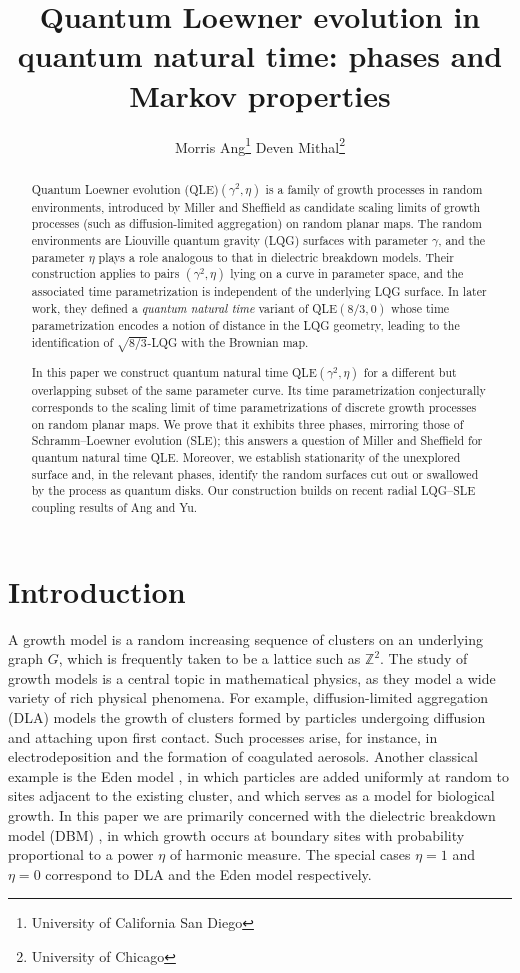 \documentclass[a4paper]{article}
\title{Quantum Loewner evolution in quantum natural time: phases and Markov properties}
\author{Morris Ang\thanks{University of California San Diego} \qquad Deven Mithal\thanks{University of Chicago}}
\date{}
\numberwithin{equation}{section}
\newcommand{\Z}{\mathbb{Z}}
\theoremstyle{remark}
\numberwithin{equation}{section}
\begin{document}
\maketitle

\begin{abstract}
Quantum Loewner evolution (QLE)$(\gamma^2, \eta)$ is a family of growth processes in random environments, introduced by Miller and Sheffield as candidate scaling limits of growth processes (such as diffusion-limited aggregation) on random planar maps. The random environments are Liouville quantum gravity (LQG) surfaces with parameter $\gamma$, and the parameter $\eta$ plays a role analogous to that in dielectric breakdown models. Their construction applies to pairs $(\gamma^2, \eta)$ lying on a curve in parameter space, and the associated time parametrization is independent of the underlying LQG surface. In later work, they defined a \emph{quantum natural time} variant of QLE$(8/3, 0)$ whose time parametrization encodes a notion of distance in the LQG geometry, leading to the identification of $\sqrt{8/3}$-LQG with the Brownian map.

In this paper we construct quantum natural time QLE$(\gamma^2, \eta)$ for a different but overlapping subset of the same parameter curve. Its time parametrization conjecturally corresponds to the scaling limit of time parametrizations of discrete growth processes on random planar maps. We prove that it exhibits three phases, mirroring those of Schramm--Loewner evolution (SLE); this answers a question of Miller and Sheffield for quantum natural time QLE. Moreover, we establish stationarity of the unexplored surface and, in the relevant phases, identify the random surfaces cut out or swallowed by the process as quantum disks. Our construction builds on recent radial LQG--SLE coupling results of Ang and Yu.
\end{abstract}


\tableofcontents

\section{Introduction}\label{sec-intro}
A growth model is a random increasing sequence of clusters on an underlying graph $G$, which is frequently taken to be a lattice such as $\Z^2$. The study of growth models is a central topic in mathematical physics, as they model a wide variety of rich physical phenomena. For example, diffusion-limited aggregation (DLA) \cite{dla-1, dla-2} models the growth of clusters formed by particles undergoing diffusion and attaching upon first contact. Such processes arise, for instance, in electrodeposition and the formation of coagulated aerosols. Another classical example is the Eden model \cite{eden}, in which particles are added uniformly at random to sites adjacent to the existing cluster, and which serves as a model for biological growth. 
In this paper we are primarily concerned with the dielectric breakdown model (DBM) \cite{dbm}, in which growth occurs at boundary sites with probability proportional to a power $\eta$ of harmonic measure. The special cases $\eta = 1$ and $\eta = 0$ correspond to DLA and the Eden model respectively. 
\end{document}
